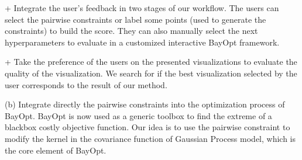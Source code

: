 + Integrate the user's feedback in two stages of our workflow.
The users can select the pairwise constraints or label some points (used to generate the constraints) to build the score.
They can also manually select the next hyperparameters to evaluate in a customized interactive BayOpt framework.

+ Take the preference of the users on the presented visualizations to evaluate the quality of the visualization. We search for if the best visualization selected by the user corresponds to the result of our method.


(b) Integrate directly the pairwise constraints into the optimization process of BayOpt.
BayOpt is now used as a generic toolbox to find the extreme of a blackbox costly objective function.
Our idea is to use the pairwise constraint to modify the kernel in the covariance function of Gaussian Process model, which is the core element of BayOpt.

